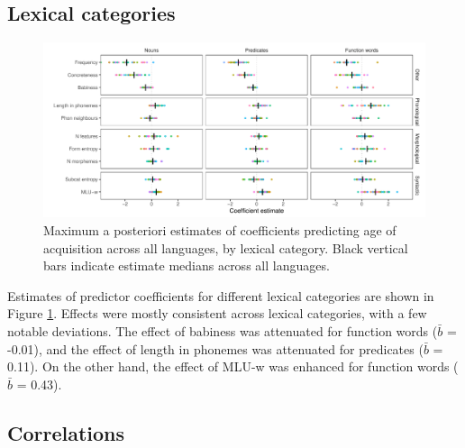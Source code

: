 \documentclass[10pt, letterpaper]{article}
\newenvironment{CodeChunk}{}{}
\begin{document}
\hypertarget{lexical-categories}{%
\subsection{Lexical categories}\label{lexical-categories}}

\begin{CodeChunk}
\begin{figure}[ht]

{\centering \includegraphics[width=500px]{figs/lc_plot-1} 

}

\caption[Maximum a posteriori estimates of coefficients predicting age of acquisition across all languages, by lexical category]{Maximum a posteriori estimates of coefficients predicting age of acquisition across all languages, by lexical category. Black vertical bars indicate estimate medians across all languages.}\label{fig:lc_plot}
\end{figure}
\end{CodeChunk}

Estimates of predictor coefficients for different lexical categories are
shown in Figure \ref{fig:lc_plot}. Effects were mostly consistent across
lexical categories, with a few notable deviations. The effect of
babiness was attenuated for function words (\(\bar{b}\) = -0.01), and
the effect of length in phonemes was attenuated for predicates
(\(\bar{b}\) = 0.11). On the other hand, the effect of MLU-w was
enhanced for function words (\(\bar{b}\) = 0.43).

\hypertarget{correlations}{%
\subsection{Correlations}\label{correlations}}
\end{document}
